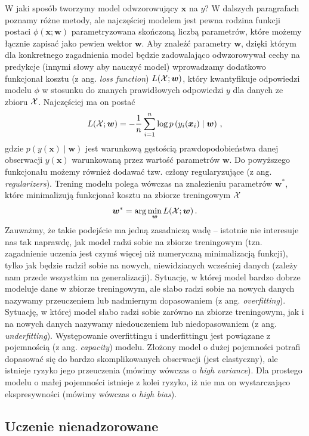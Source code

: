 \documentclass{myclass}
\numberwithin{equation}{subsection}
\begin{document}
W jaki sposób tworzymy model odwzorowujący \(\bm{x}\) na \(y\)? W dalszych paragrafach poznamy różne
metody, ale najczęściej modelem jest pewna rodzina funkcji postaci \(\phi(\bm{x}; \bm{w})\)
parametryzowana skończoną liczbą parametrów, które możemy łącznie zapisać jako pewien wektor
\(\bm{w}\). Aby znaleźć parametry \(\bm{w}\), dzięki którym dla konkretnego zagadnienia model będzie
zadowalająco odwzorowywał cechy na predykcje (innymi słowy aby nauczyć model) wprowadzamy dodatkowo
funkcjonał kosztu (z ang. \textit{loss function}) \(L(\mathcal{X}; \bm{w})\), który kwantyfikuje
odpowiedzi modelu \(\phi\) w stosunku do znanych prawidłowych odpowiedzi \(y\) dla danych ze zbioru
\(\mathcal{X}\). Najczęściej ma on postać
\[
L(\mathcal{X}; \bm{w}) = - \frac{1}{n} \sum_{i=1}^n \log p\left( y_i(\bm{x}_i) \mid \bm{w} \right)\,,
\]
gdzie \(p(y(\bm{x}) \mid \bm{w})\) jest warunkową gęstością prawdopodobieństwa danej obserwacji
\(y(\bm{x})\) warunkowaną przez wartość parametrów \(\bm{w}\). Do powyższego funkcjonału możemy
również dodawać tzw. człony regularyzujące (z ang. \textit{regularizers}). Trening modelu polega
wówczas na znalezieniu parametrów \(\bm{w}^*\), które minimalizują funkcjonał kosztu na zbiorze
treningowym \(\mathcal{X}\)
\begin{equation}
    \bm{w}^* = \arg\min_{\bm{w}} L(\mathcal{X};\bm{w})\,.
\end{equation}
Zauważmy, że takie podejście ma jedną zasadniczą wadę -- istotnie nie interesuje nas tak naprawdę,
jak model radzi sobie na zbiorze treningowym (tzn. zagadnienie uczenia jest czymś więcej niż
numeryczną minimalizacją funkcji), tylko jak będzie radził sobie na nowych, niewidzianych wcześniej
danych (zależy nam przede wszystkim na generalizacji). Sytuację, w której model bardzo dobrze
modeluje dane w zbiorze treningowym, ale słabo radzi sobie na nowych danych nazywamy przeuczeniem
lub nadmiernym dopasowaniem (z ang. \textit{overfitting}). Sytuację, w której model słabo radzi
sobie zarówno na zbiorze treningowym, jak i na nowych danych nazywamy niedouczeniem lub
niedopasowaniem (z ang. \textit{underfitting}). Występowanie overfittingu i underfittingu jest
powiązane z pojemnością (z ang. \textit{capacity}) modelu. Złożony model o dużej pojemności potrafi
dopasować się do bardzo skomplikowanych obserwacji (jest elastyczny), ale istnieje ryzyko jego
przeuczenia (mówimy wówczas o \textit{high variance}). Dla prostego modelu o małej pojemności
istnieje z kolei ryzyko, iż nie ma on wystarczająco ekspresywności (mówimy wówczas o \textit{high
bias}).


\subsection{Uczenie nienadzorowane}
\end{document}
